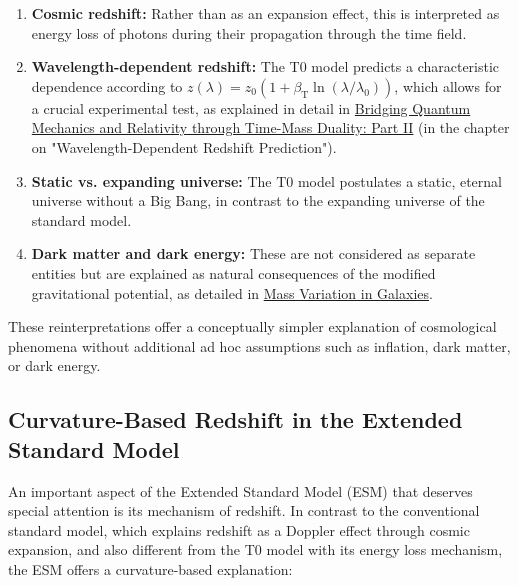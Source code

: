 \documentclass[12pt,a4paper]{article}
\newcommand{\betaT}{\beta_{\text{T}}}
\begin{document}
	\begin{enumerate}
		\item \textbf{Cosmic redshift:} Rather than as an expansion effect, this is interpreted as energy loss of photons during their propagation through the time field.
		
		\item \textbf{Wavelength-dependent redshift:} The T0 model predicts a characteristic dependence according to $z(\lambda) = z_0 (1 + \betaT \ln(\lambda/\lambda_0))$, which allows for a crucial experimental test, as explained in detail in \href{https://github.com/jpascher/T0-Time-Mass-Duality/tree/main/2/pdf/English/QMRelTimeMassPart2En.pdf}{Bridging Quantum Mechanics and Relativity through Time-Mass Duality: Part II} (in the chapter on "Wavelength-Dependent Redshift Prediction").
		
		\item \textbf{Static vs. expanding universe:} The T0 model postulates a static, eternal universe without a Big Bang, in contrast to the expanding universe of the standard model.
		
		\item \textbf{Dark matter and dark energy:} These are not considered as separate entities but are explained as natural consequences of the modified gravitational potential, as detailed in \href{https://github.com/jpascher/T0-Time-Mass-Duality/tree/main/2/pdf/English/MassVarGalaxienEn.pdf}{Mass Variation in Galaxies}.
	\end{enumerate}
	
	These reinterpretations offer a conceptually simpler explanation of cosmological phenomena without additional ad hoc assumptions such as inflation, dark matter, or dark energy.
	
	\subsection{Curvature-Based Redshift in the Extended Standard Model}
	\label{subsec:esm_redshift}
	
	An important aspect of the Extended Standard Model (ESM) that deserves special attention is its mechanism of redshift. In contrast to the conventional standard model, which explains redshift as a Doppler effect through cosmic expansion, and also different from the T0 model with its energy loss mechanism, the ESM offers a curvature-based explanation:
	
\end{document}
